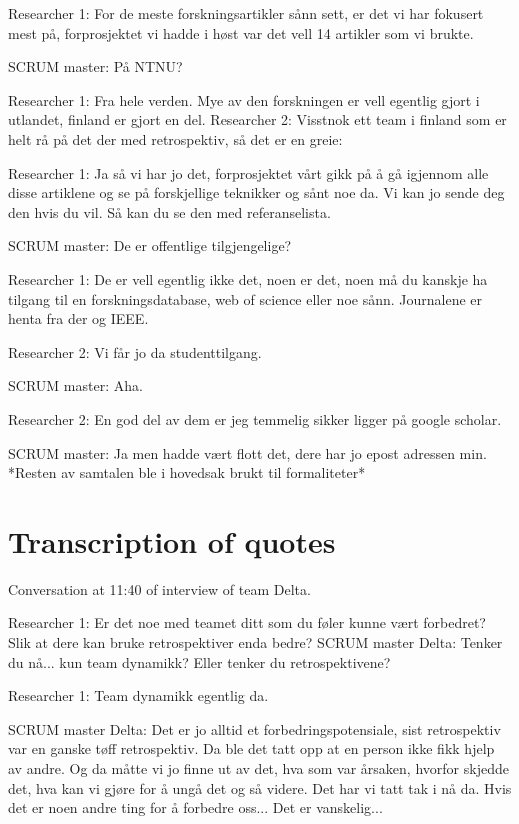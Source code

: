 Researcher 1: For de meste forskningsartikler sånn sett, er det vi har fokusert mest på, forprosjektet vi hadde i høst var det vell 14 artikler som vi brukte.

SCRUM master: På NTNU?

Researcher 1: Fra hele verden. Mye av den forskningen er vell egentlig gjort i utlandet, finland er gjort en del.
Researcher 2: Visstnok ett team i finland som er helt rå på det der med retrospektiv, så det er en greie:

Researcher 1: Ja så vi har jo det, forprosjektet vårt gikk på å gå igjennom alle disse artiklene og se på forskjellige teknikker og sånt noe da. Vi kan jo sende deg den hvis du vil. Så kan du se den med referanselista.

SCRUM master: De er offentlige tilgjengelige?

Researcher 1: De er vell egentlig ikke det, noen er det, noen må du kanskje ha tilgang til en forskningsdatabase, web of science eller noe sånn. Journalene er henta fra der og IEEE.

Researcher 2: Vi får jo da studenttilgang.

SCRUM master: Aha.

Researcher 2: En god del av dem er jeg temmelig sikker ligger på google scholar. 

SCRUM master: Ja men hadde vært flott det, dere har jo epost adressen min.
*Resten av samtalen ble i hovedsak brukt til formaliteter*

\chapter{Transcription of quotes}
\label{section:transcription-of-quotes}

Conversation at 11:40 of interview of team Delta.

Researcher 1: Er det noe med teamet ditt som du føler kunne vært forbedret? Slik at dere kan bruke retrospektiver enda bedre?
SCRUM master Delta: Tenker du nå... kun team dynamikk? Eller tenker du retrospektivene?

Researcher 1: Team dynamikk egentlig da.

SCRUM master Delta: Det er jo alltid et forbedringspotensiale, sist retrospektiv var en ganske tøff retrospektiv. Da ble det tatt opp at en person ikke fikk hjelp av andre. Og da måtte vi jo finne ut av det, hva som var årsaken, hvorfor skjedde det, hva kan vi gjøre for å ungå det og så videre. Det har vi tatt tak i nå da. Hvis det er noen andre ting for å forbedre oss... Det er vanskelig...

